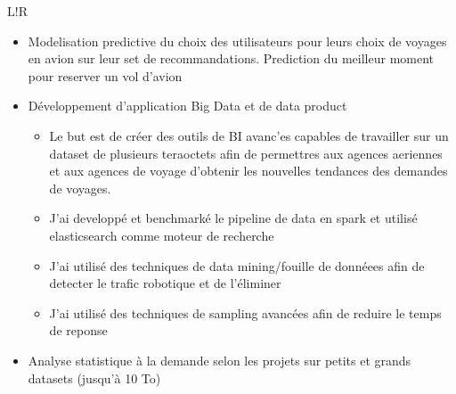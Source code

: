\documentclass[6pt]{article}
\newcommand\VRule{\color{lightgray}\vrule width 0.5pt}
\begin{document}
\begin{tabular}{L!{\VRule}R}
\begin{itemize}
	\item Modelisation predictive du choix des utilisateurs pour leurs choix de voyages en avion sur leur set de recommandations. Prediction du meilleur moment pour reserver un vol d'avion
	\item D\'{e}veloppement d'application Big Data et de data product
		\begin{itemize}
			\item Le but est de cr\'{e}er des outils de BI avanc'es capables de travailler sur un dataset de plusieurs teraoctets afin de permettres aux agences aeriennes et aux agences de voyage d'obtenir les nouvelles tendances des demandes de voyages. 
		\item J'ai developp\'{e} et benchmark\'{e} le pipeline de data en spark et utilis\'{e} elasticsearch comme moteur de recherche
		\item J'ai utilis\'{e} des techniques de data mining/fouille de donn\'{e}ees afin de detecter le trafic robotique et de l'\'{e}liminer
		\item J'ai utilis\'{e} des techniques de sampling avanc\'{e}es afin de reduire le temps de reponse
		\end{itemize}
	\item Analyse statistique \`{a} la demande selon les projets sur petits et grands datasets (jusqu'\`{a} 10 To)
\end{itemize}


\end{tabular}
\end{document}
